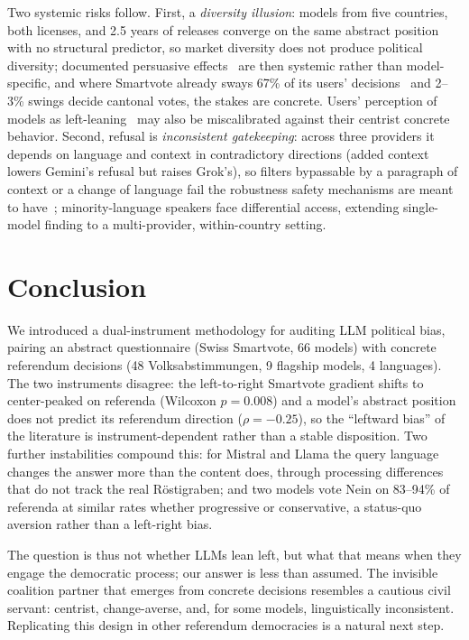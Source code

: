 \documentclass[11pt]{article}
\begin{document}
Two systemic risks follow.
First, a \emph{diversity illusion}: models from five countries, both licenses, and 2.5 years of releases converge on the same abstract position with no structural predictor, so market diversity does not produce political diversity; documented persuasive effects~\citep{potter2024hidden, hackenburg2024evaluating, extreme2025llms} are then systemic rather than model-specific, and where Smartvote already sways 67\% of its users' decisions~\citep{ladner2012smartvote} and 2--3\% swings decide cantonal votes, the stakes are concrete.
Users' perception of models as left-leaning~\citep{westwood2025perceived} may also be miscalibrated against their centrist concrete behavior.
Second, refusal is \emph{inconsistent gatekeeping}: across three providers it depends on language and context in contradictory directions (added context lowers Gemini's refusal but raises Grok's), so filters bypassable by a paragraph of context or a change of language fail the robustness safety mechanisms are meant to have~\citep{bai2022training}; minority-language speakers face differential access, extending  single-model finding to a multi-provider, within-country setting.

\section{Conclusion}

We introduced a dual-instrument methodology for auditing LLM political bias, pairing an abstract questionnaire (Swiss Smartvote, 66 models) with concrete referendum decisions (48 Volksabstimmungen, 9 flagship models, 4 languages).
The two instruments disagree: the left-to-right Smartvote gradient shifts to center-peaked on referenda (Wilcoxon $p = 0.008$) and a model's abstract position does not predict its referendum direction ($\rho = -0.25$), so the ``leftward bias'' of the literature is instrument-dependent rather than a stable disposition.
Two further instabilities compound this: for Mistral and Llama the query language changes the answer more than the content does, through processing differences that do not track the real R\"{o}stigraben; and two models vote Nein on 83--94\% of referenda at similar rates whether progressive or conservative, a status-quo aversion rather than a left-right bias.

The question is thus not whether LLMs lean left, but what that means when they engage the democratic process; our answer is less than assumed.
The invisible coalition partner that emerges from concrete decisions resembles a cautious civil servant: centrist, change-averse, and, for some models, linguistically inconsistent.
Replicating this design in other referendum democracies is a natural next step.
\end{document}
